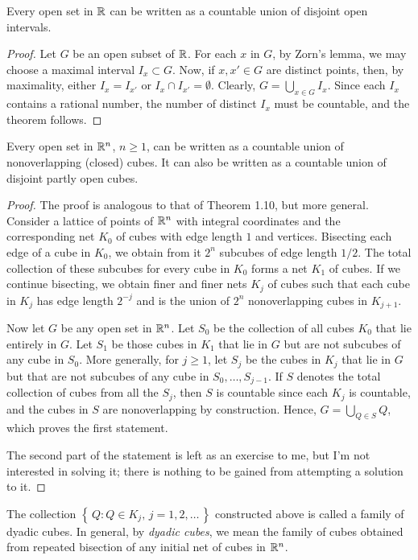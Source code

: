 \begin{theorem}[1.10]
Every open set in $\mathbb{R}$ can be written as a countable union of disjoint
open intervals.
\end{theorem}
\begin{proof}
Let $G$ be an open subset of $\mathbb{R}$. For each $x$ in $G$, by Zorn's lemma,
we may choose a maximal interval $I_x\subset G$. Now, if $x,x'\in G$ are
distinct points, then, by maximality, either $I_{x}=I_{x'}$ or $I_{x}\cap
I_{x'}=\emptyset$. Clearly, $G=\bigcup_{x\in G} I_x$. Since each $I_x$
contains a rational number, the number of distinct $I_x$ must be countable,
and the theorem follows.
\end{proof}
\begin{theorem}[1.11]
Every open set in $\mathbb{R}^n$, $n\geq 1$, can be written as a countable union
of nonoverlapping (closed) cubes. It can also be written as a countable
union of disjoint partly open cubes.
\end{theorem}
\begin{proof}
The proof is analogous to that of Theorem 1.10, but more general. Consider
a lattice of points of $\mathbb{R}^n$ with integral coordinates and the
corresponding net $K_0$ of cubes with edge length $1$ and
vertices. Bisecting each edge of a cube in $K_0$, we obtain from it $2^n$
subcubes of edge length $1/2$. The total collection of these subcubes for
every cube in $K_0$ forms a net $K_1$ of cubes. If we continue bisecting,
we obtain finer and finer nets $K_j$ of cubes such that each cube in $K_j$
has edge length $2^{-j}$ and is the union of $2^n$ nonoverlapping cubes in
$K_{j+1}$.

Now let $G$ be any open set in $\mathbb{R}^n$. Let $S_0$ be the collection of all
cubes $K_0$ that lie entirely in $G$. Let $S_1$ be those cubes in $K_1$
that lie in $G$ but are not subcubes of any cube in $S_0$. More generally,
for $j\geq 1$, let $S_j$ be the cubes in $K_j$ that lie in $G$ but that are
not subcubes of any cube in $S_0,\dotsc,S_{j-1}$. If $S$ denotes the total
collection of cubes from all the $S_j$, then $S$ is countable since each
$K_j$ is countable, and the cubes in $S$ are nonoverlapping by
construction. Hence, $G=\bigcup_{Q\in S}Q$, which proves the first
statement.

The second part of the statement is left as an exercise to me, but I'm not
interested in solving it; there is nothing to be gained from attempting a
solution to it.
\end{proof}

The collection $\left\{\,Q:\text{$Q\in K_j$, $j=1,2,\dotsc$}\,\right\}$
constructed above is called a family of dyadic cubes. In general, by
\emph{dyadic cubes}, we mean the family of cubes obtained from repeated
bisection of any initial net of cubes in $\mathbb{R}^n$.


